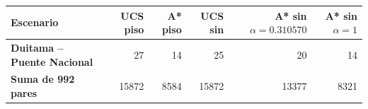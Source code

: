 \renewcommand{\arraystretch}{1.2}
\begin{tabular}{|l|r|r|r|r|r|}
\hline
\rowcolor{gray!20} \textbf{Escenario} & \textbf{UCS piso} & \textbf{A* piso} & \textbf{UCS sin} & \textbf{A* sin $\alpha=0.310570$} & \textbf{A* sin $\alpha=1$} \\
\hline
\textbf{Duitama -- Puente Nacional} & 27 & 14 & 25 & 20 & 14 \\
\hline
\textbf{Suma de 992 pares} & 15872 & 8584 & 15872 & 13377 & 8321 \\
\hline
\end{tabular}
